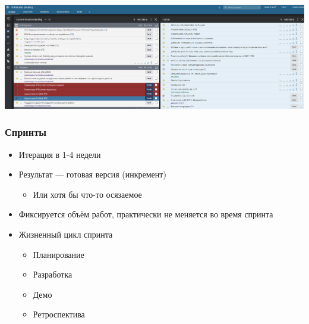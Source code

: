 \documentclass{../../slides-style}
\begin{document}
    \begin{frame}
        \begin{center}
            \includegraphics[width=\textwidth]{pivotalTracker.png}
        \end{center}
    \end{frame}

    \begin{frame}
        \frametitle{Спринты}
        \begin{itemize}
            \item Итерация в 1-4 недели
            \item Результат --- готовая версия (инкремент)
            \begin{itemize}
                \item Или хотя бы что-то осязаемое
            \end{itemize}
            \item Фиксируется объём работ, практически не меняется во время
            спринта
            \item Жизненный цикл спринта
            \begin{itemize}
                \item Планирование
                \item Разработка
                \item Демо
                \item Ретроспектива
            \end{itemize}
        \end{itemize}
    \end{frame}
\end{document}
